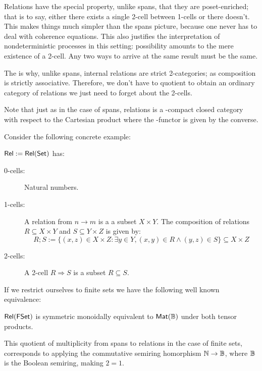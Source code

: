 Relations have the special property, unlike spans, that they are poset-enriched; that is to say, either there exists a single 2-cell between 1-cells or there doesn't. This makes things much simpler than the spans picture, because one never has to deal with coherence equations.  This also justifies the interpretation of nondeterministic processes in this setting: possibility amounts to the mere existence of a 2-cell.  Any two ways to arrive at the same result must be the same.


The is why, unlike spans, internal relations are  strict 2-categories; as  composition is strictly associative. Therefore, we don't have to quotient to obtain an ordinary category of relations we just need to forget about the 2-cells.

Note that just as in the case of spans, relations is a \dag-compact closed category with respect to the Cartesian product where the \dag-functor is given by the converse.









Consider the following concrete example:
\begin{example}
$\mathsf{Rel}:=\mathsf{Rel}(\mathsf{Set})$ has:
\begin{description}
\item[0-cells:] Natural numbers.
\item[1-cells:] A relation from $n\to m$ is a a subset $X \times Y$.
The composition of relations $R \subseteq X \times Y$  and $S \subseteq Y \times Z$ is given by:
$$
R;S := \{  (x,z) \in X\times Z: \exists y \in Y, (x,y) \in R \wedge (y,z) \in S \} \subseteq X\times Z
$$ 
\item[2-cells:] 
A 2-cell $R\Rightarrow S$ is a subset $R\subseteq S$.
\end{description}
\end{example}
If we restrict ourselves to finite sets we have the following well known equivalence:
\begin{lemma}
$\mathsf{Rel}(\mathsf{FSet})$ is symmetric monoidally equivalent to $\mathsf{Mat}(\mathbb{B})$ under both tensor products. 
\end{lemma}
This quotient of multiplicity from spans to relations in the case of finite sets, corresponds to applying the commutative semiring homorphism $\mathbb{N}\to \mathbb{B}$, where $\mathbb{B}$ is the Boolean semiring, making $2=1$.

